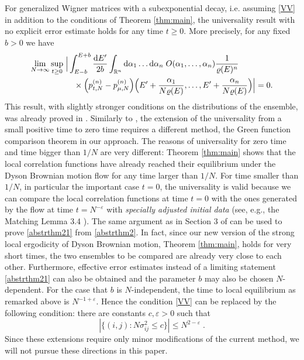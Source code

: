 \documentclass[draft]{article}
\newcommand{\e}{\varepsilon}
\newcommand{\rd}{{\rm d}}
\newcommand{\be}{\begin{equation}}
\newcommand{\ee}{\end{equation}}
\newcommand{\R}{{\mathbb R }}
\numberwithin{equation}{section}
\numberwithin{theorem}{section}
\numberwithin{definition}{section}
\numberwithin{remark}{section}
\begin{document}
For generalized Wigner matrices with a subexponential
decay, i.e. assuming \eqref{VV}
in addition to  the conditions of Theorem \ref{thm:main}, 
the universality result with no explicit error 
estimate  holds  for any time $t\ge0$. More precisely,
for any fixed $b>0$ we have
\be
\begin{split}
 \lim_{N\to\infty}\sup_{t\ge 0}\; & \Big | \int_{E-b}^{E+b}\frac{\rd E'}{2b}
\int_{\R^n}   \rd\alpha_1
\ldots \rd\alpha_n \; O(\alpha_1,\ldots,\alpha_n) 
 \frac{1}{\varrho(E)^n} \\
& \quad \times   \Big ( p_{t,N}^{(n)}  - p_{\mu, N} ^{(n)} \Big )
\Big (E'+\frac{\alpha_1}{N\varrho(E)},
\ldots, E'+\frac{\alpha_n}{ N\varrho(E)}\Big) \Big | 
=0.
\label{abstrthm21}
\end{split}
\ee
This result, with slightly stronger conditions on
the distributions of the ensemble,  was already proved   in  \cite{EYY2}.
Similarly to \cite{EYY2}, the extension of the universality from a small positive time
to zero time requires a different method, the Green function comparison 
theorem \cite{EYY}   in our approach. The reasons of  universality  for zero time and
 time bigger than $1/N$ are very different:
Theorem \ref{thm:main} shows that 
the local correlation functions have already reached their equilibrium 
under the Dyson Brownian motion flow for any time larger than $1/N$. 
For time smaller than $1/N$,  in particular the important case $t=0$, the universality is valid 
because  we can compare the local correlation functions at time $t=0$ with 
the ones generated by the flow at time  $t=N^{-\e}$ with 
{\it specially adjusted initial data} (see, e.g., the Matching Lemma 3.4 \cite{EYY2}).
The same argument as in Section 3 of \cite{EYY2} can be used to prove \eqref{abstrthm21} from 
\eqref{abstrthm2}.
In fact, since our new version of  the strong local ergodicity of Dyson Brownian motion, 
Theorem \ref{thm:main},   holds for very short times,  the two ensembles to be compared 
are already  very close to each other. 
 Furthermore,  
effective error estimates instead of a limiting statement \eqref{abstrthm21} can also be obtained
and the parameter $b$ may also be chosen $N$-dependent. For the case that $b$ is $N$-independent, 
the time to local equilibrium as remarked above is $N^{-1+ \e}$. Hence the condition \eqref{VV} can be replaced by
the following condition: there are  constants $c, \e  > 0$ such that 
\be
| \{ (i, j): N \sigma_{ij}^2  \le c \} | \le N^{2 - \e}  \; .
\ee
 Since these extensions require only minor modifications of the current method, 
 we will not pursue these directions in this paper.  
\end{document}
